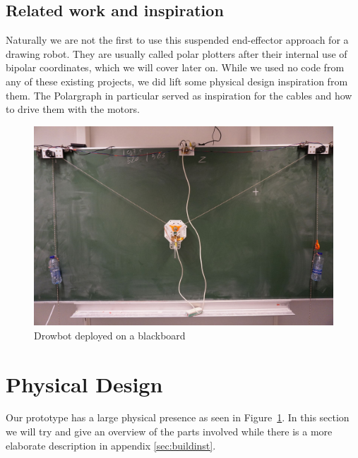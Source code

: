 \documentclass[12pt]{article}
\begin{document}
\subsection*{Related work and inspiration}
Naturally we are not the first to use this suspended end-effector
approach for a drawing robot.
They are usually called polar plotters after their internal use
of bipolar coordinates, which we will cover later on.
While we used no code from any of these existing projects, we did
lift some physical design inspiration from them.
The Polargraph \cite{polargraphsite} in particular served as
inspiration for the cables and how to drive them with the motors.



\begin{figure}
  \centering
  \includegraphics{img/overview_rs.jpg}
  \caption{Drowbot deployed on a blackboard}
  \label{fig:overview}
\end{figure}
\section{Physical Design}
\label{sec:design}
Our prototype has a large physical presence as seen in Figure~\ref{fig:overview}.
In this section we will try and give an overview of the parts involved
while there is a more elaborate description in appendix \ref{sec:buildinst}.
\end{document}

